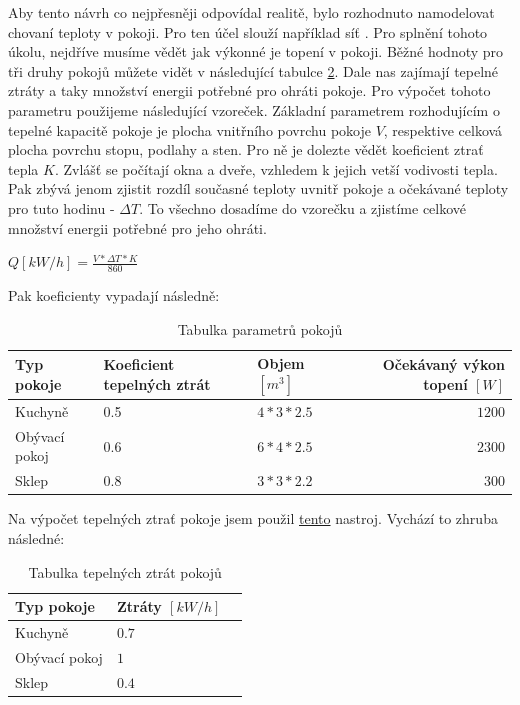 Aby tento návrh co nejpřesněji odpovídal realitě, bylo rozhodnuto namodelovat chovaní teploty v pokoji. Pro ten účel slouží například síť .
Pro splnění tohoto úkolu, nejdříve musíme vědět jak výkonné je topení v pokoji. Běžné hodnoty pro tři druhy pokojů můžete vidět v následující tabulce \ref{tab:TepelneZtraty}. Dale nas zajímají tepelné ztráty a taky množství energii potřebné pro ohráti pokoje. Pro výpočet tohoto parametru použijeme následující vzoreček. Základní parametrem rozhodujícím o tepelné kapacitě pokoje je plocha vnitřního povrchu pokoje $V$, respektive celková plocha povrchu stopu, podlahy a sten. Pro ně je dolezte vědět koeficient ztrať tepla $K$. Zvlášť se počítají okna a dveře, vzhledem k jejich vetší vodivosti tepla. Pak zbývá jenom zjistit rozdíl současné teploty uvnitř pokoje a očekávané teploty pro tuto hodinu - $\Delta{T}$. To všechno dosadíme do vzorečku a zjistíme celkové množství energii potřebné pro jeho ohráti. \cite{tep_calc}
\begin{center}
  $Q[kW/h] = \frac{V*\Delta{T}*K}{860}$
\end{center}

Pak koeficienty vypadají následně:

\begin{table}[H]
	\vskip6pt
	\caption{Tabulka parametrů pokojů}
    \vskip6pt
	\centering
	\begin{tabular}{lllr}
		\toprule
		Typ pokoje & Koeficient tepelných ztrát & Objem $[m^3]$ & Očekávaný výkon topení $[W]$ \\
    \midrule
    Kuchyně & 0.5 & $4*3*2.5$ & $1200$ \\
    Obývací pokoj & 0.6 & $6*4*2.5$ & $2300$ \\
    Sklep & 0.8 & $3*3*2.2$ & $300$ \\
		\bottomrule
	\end{tabular}
	\label{tab:Parametry}
\end{table}

Na výpočet tepelných ztrať pokoje jsem použil \href{https://wpcalc.com/kalkulyator-teplopoter/}{tento} nastroj.
Vychází to zhruba následné:

\begin{table}[H]
	\vskip6pt
	\caption{Tabulka tepelných ztrát pokojů}
    \vskip6pt
	\centering
	\begin{tabular}{llr}
		\toprule
		Typ pokoje & Ztráty $[kW/h]$ \\
		\midrule
		Kuchyně & $0.7$ \\
    Obývací pokoj & $1$ \\
    Sklep & $0.4$ \\
		\bottomrule
	\end{tabular}
	\label{tab:TepelneZtraty}
\end{table}

